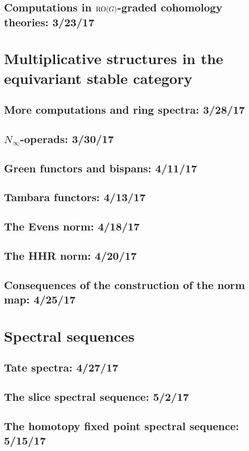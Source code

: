\documentclass[openany]{style_EHT}
\begin{document}
\section{Computations in $\mathrm{RO}(G)$-graded cohomology theories: 3/23/17}
	

\chapter{Multiplicative structures in the equivariant stable category}
\section{More computations and ring spectra: 3/28/17}
	
\section{$N_\infty$-operads: 3/30/17}
	
\section{Green functors and bispans: 4/11/17}
	
\section{Tambara functors: 4/13/17}
	
\section{The Evens norm: 4/18/17}
	
\section{The HHR norm: 4/20/17}
	
\section{Consequences of the construction of the norm map: 4/25/17}
	

\chapter{Spectral sequences}
\section{Tate spectra: 4/27/17}
	
\section{The slice spectral sequence: 5/2/17}
	
\section{The homotopy fixed point spectral sequence: 5/15/17}
	

\backmatter

\clearpage
{}
{}

\end{document}
